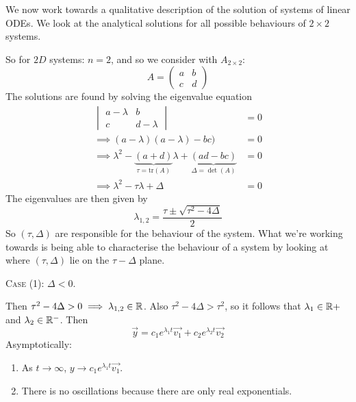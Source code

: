 \documentclass[10pt]{scrartcl}
\renewcommand{\l}{\lambda}
\begin{document}



We now work towards a qualitative description of the solution of systems of linear ODEs. We look at the analytical solutions for all possible behaviours of $2 \times 2$ systems. 

So for $2D$ systems: $n = 2$, and so we consider with $A_{2\times 2}$:
\[
  A = 
  \begin{pmatrix}
  a & b \\ c& d
\end{pmatrix}
\]
The solutions are found by solving the eigenvalue equation
\begin{align*}
  \begin{vmatrix}
  a - \l & b \\ c & d-\l	
  \end{vmatrix}&= 0\\
  \implies (a-\l)(a-\l) -bc) &= 0\\
  \implies \l^2 - \underbrace{(a+d)}_{\tau = \mathrm{tr}(A)}\l + \underbrace{(ad-bc)}_{\Delta = \det(A)} &= 0\\[.2cm]
  \implies \l^2 -\tau \l + \Delta &= 0
\end{align*}
The eigenvalues are then given by 
\[
  \lambda_{1,2} = \frac{\tau \pm \sqrt{\tau^2 - 4\Delta}}{2}
\]
So $(\tau,\Delta)$ are responsible for the behaviour of the system. What we're working towards is being able to characterise the behaviour of a system by looking at where $(\tau,\Delta)$ lie on the $\tau -\Delta$ plane. 

\begin{center}
\end{center}


\textsc{Case (1):} $\Delta < 0$. 

Then $\tau^2 - 4\Delta > 0 \implies \l_{1,2}\iR$. Also $\tau^2 - 4\Delta > \tau^2$, so it follows that $\lambda_1\in\mathbb{R}+$ and $\l_2\iR^-$. Then 
\[
  \vec{y} = c_1e^{\l_1t}\vec{v_1} + c_2e^{\l_2t}\vec{v_2}
\]
Asymptotically:

\begin{enumerate}
  \item  As $t \to \infty$, $y \to c_1e^{\l_1t}\vec{v_1}$. 
  \item There is no oscillations because there are only real exponentials.
\end{enumerate}
\end{document}
